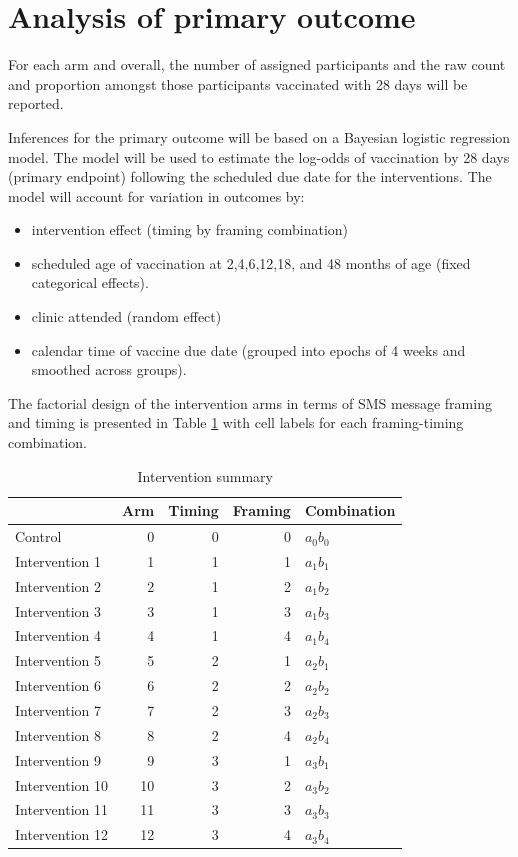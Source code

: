 \documentclass[
  bibliography=totoc]{scrreprt}
\providecommand{\tightlist}{%
  \setlength{\itemsep}{0pt}\setlength{\parskip}{0pt}}
\begin{document}
\hypertarget{analysis-of-primary-outcome}{%
\section{Analysis of primary outcome}\label{analysis-of-primary-outcome}}

For each arm and overall, the number of assigned participants and the raw count and proportion amongst those participants vaccinated with 28 days will be reported.

Inferences for the primary outcome will be based on a Bayesian logistic regression model.
The model will be used to estimate the log-odds of vaccination by 28 days (primary endpoint) following the scheduled due date for the interventions.
The model will account for variation in outcomes by:

\begin{itemize}
\tightlist
\item
  intervention effect (timing by framing combination)
\item
  scheduled age of vaccination at 2,4,6,12,18, and 48 months of age (fixed categorical effects).
\item
  clinic attended (random effect)
\item
  calendar time of vaccine due date (grouped into epochs of 4 weeks and smoothed across groups).
\end{itemize}

The factorial design of the intervention arms in terms of SMS message framing and timing is presented in Table \ref{tab:intsum} with cell labels for each framing-timing combination.

\begin{table}[H]

\caption{\label{tab:intsum}Intervention summary}
\centering
\fontsize{10}{12}\selectfont
\begin{tabular}[t]{lrrrl}
\toprule
  & Arm & Timing & Framing & Combination\\
\midrule
Control & 0 & 0 & 0 & $a_0b_0$\\
Intervention 1 & 1 & 1 & 1 & $a_1$$b_1$\\
Intervention 2 & 2 & 1 & 2 & $a_1$$b_2$\\
Intervention 3 & 3 & 1 & 3 & $a_1$$b_3$\\
Intervention 4 & 4 & 1 & 4 & $a_1$$b_4$\\
Intervention 5 & 5 & 2 & 1 & $a_2$$b_1$\\
Intervention 6 & 6 & 2 & 2 & $a_2$$b_2$\\
Intervention 7 & 7 & 2 & 3 & $a_2$$b_3$\\
Intervention 8 & 8 & 2 & 4 & $a_2$$b_4$\\
Intervention 9 & 9 & 3 & 1 & $a_3$$b_1$\\
Intervention 10 & 10 & 3 & 2 & $a_3$$b_2$\\
Intervention 11 & 11 & 3 & 3 & $a_3$$b_3$\\
Intervention 12 & 12 & 3 & 4 & $a_3$$b_4$\\
\bottomrule
\end{tabular}
\end{table}
\end{document}
